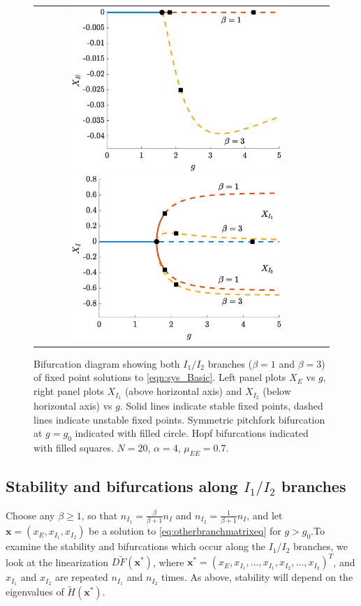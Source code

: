 \documentclass[11pt,reqno]{amsart}
\newcommand{\xvec}{\mathbf{x}}
\begin{document}
\begin{figure}
    \centering
    \begin{tabular}{cc}
    \includegraphics[width=8cm]{images/bdnoclusters20E.eps}
    \includegraphics[width=8cm]{images/bdnoclusters20I.eps}
    \end{tabular}
    \caption{Bifurcation diagram showing both $I_1/I_2$ branches ($\beta = 1$ and $\beta = 3$) of fixed point solutions to \cref{eqn:sys_Basic}. Left panel plots $X_E$ vs $g$, right panel plots $X_{I_1}$ (above horizontal axis) and $X_{I_2}$ (below horizontal axis) vs $g$. Solid lines indicate stable fixed points, dashed lines indicate unstable fixed points. Symmetric pitchfork bifurcation at $g = g_0$ indicated with filled circle. Hopf bifurcations indicated with filled squares. 
    $N = 20$,  $\alpha = 4$, $\mu_{EE} = 0.7$.}
    \label{fig:noclusterBD1}
\end{figure}

\subsection{Stability and bifurcations along $I_1/I_2$ branches}

Choose any $\beta \geq 1$, so that $n_{I_1} = \frac{\beta}{\beta+1}n_I$ and $n_{I_2} = \frac{1}{\beta+1}n_I$, and let $\xvec = (x_E, x_{I_1}, x_{I_2})$ be a solution to \cref{eq:otherbranchmatrixeq} for $g > g_0$.To examine the stability and bifurcations which occur along the $I_1/I_2$ branches, we look at the linearization $D\tilde{F}(\xvec^*)$, where $\xvec^* = (x_E, x_{I_1}, \dots, x_{I_1}, x_{I_2}, \dots, x_{I_2})^T$, and $x_{I_1}$ and $x_{I_2}$ are repeated $n_{I_1}$ and $n_{I_2}$ times. As above, stability will depend on the eigenvalues of $\tilde{H}(\xvec^*)$.
\end{document}

